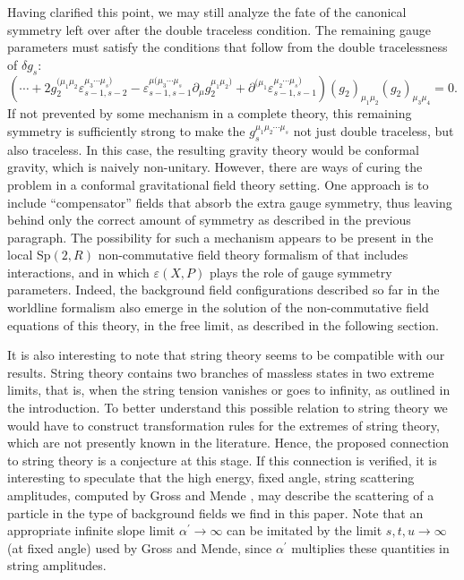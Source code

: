 \documentclass[a4paper,12pt]{article}
\begin{document}
Having clarified this point, we may still analyze the fate of the canonical
symmetry left over after the double traceless condition. The remaining gauge
parameters must satisfy the conditions that follow from the double
tracelessness of $\delta g_{s}:$
\begin{equation}
\left( \cdots +2g_{2}^{(\mu _{1}\mu _{2}}\varepsilon _{s-1,s-2}^{\mu
_{3}\cdots \mu _{s})}-\varepsilon _{s-1,s-1}^{\mu (\mu _{3}\cdots \mu
_{s}}\partial _{\mu }g_{2}^{\mu _{1}\mu _{2})}+\partial ^{(\mu
_{1}}\varepsilon _{s-1,s-1}^{\mu _{2}\cdots \mu _{s})}\right) \left(
g_{2}\right) _{\mu _{1}\mu _{2}}\left( g_{2}\right) _{\mu _{3}\mu _{4}}=0.
\end{equation}
If not prevented by some mechanism in a complete theory, this remaining
symmetry is sufficiently strong to make the $g_{s}^{\mu _{1}\mu _{2}\cdots
\mu _{s}}$ not just double traceless, but also traceless. In this case, the
resulting gravity theory would be conformal gravity, which is naively
non-unitary. However, there are ways of curing the problem in a conformal
gravitational field theory setting. One approach is to include
``compensator'' fields that absorb the extra gauge symmetry, thus leaving
behind only the correct amount of symmetry as described in the previous
paragraph. The possibility for such a mechanism appears to be present in the
local Sp$\left( 2,R\right) $ non-commutative field theory formalism of \cite
{ncsp} that includes interactions, and in which $\varepsilon \left(
X,P\right) $ plays the role of gauge symmetry parameters. Indeed, the
background field configurations described so far in the worldline formalism
also emerge in the solution of the non-commutative field equations of this
theory, in the free limit, as described in the following section.

It is also interesting to note that string theory seems to be compatible
with our results. String theory contains two branches of massless states in
two extreme limits, that is, when the string tension vanishes or goes to
infinity, as outlined in the introduction. To better understand this
possible relation to string theory we would have to construct transformation
rules for the extremes of string theory, which are not presently known in
the literature. Hence, the proposed connection to string theory is a
conjecture at this stage. If this connection is verified, it is interesting
to speculate that the high energy, fixed angle, string scattering
amplitudes, computed by Gross and Mende \cite{gross}, may describe the
scattering of a particle in the type of background fields we find in this
paper. Note that an appropriate infinite slope limit $\alpha ^{\prime
}\rightarrow \infty $ can be imitated by the limit $s,t,u\rightarrow \infty $
(at fixed angle) used by Gross and Mende, since $\alpha ^{\prime }$
multiplies these quantities in string amplitudes.
\end{document}
